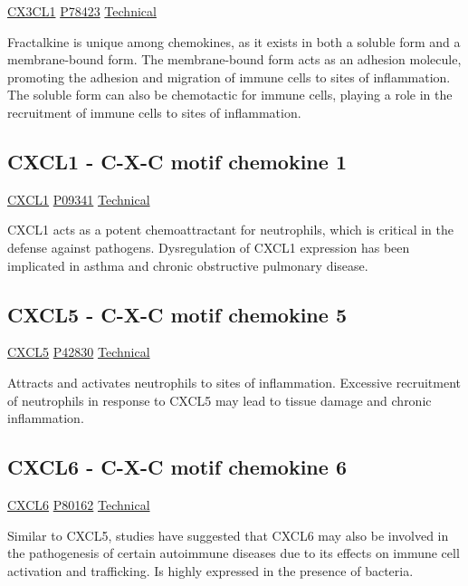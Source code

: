 \href{https://en.wikipedia.org/wiki/CX3CL1}{CX3CL1}
\href{http://www.uniprot.org/uniprot/P78423}{P78423}
\href{https://olink.com/products-services/target/protein/?assayID=5120}{Technical}

Fractalkine is unique among chemokines, as it exists in both a soluble form and a membrane-bound form. The membrane-bound form acts as an adhesion molecule, promoting the adhesion and migration of immune cells to sites of inflammation. The soluble form can also be chemotactic for immune cells, playing a role in the recruitment of immune cells to sites of inflammation.

\subsection{CXCL1 - C-X-C motif chemokine 1}

\href{https://en.wikipedia.org/wiki/CXCL1}{CXCL1}
\href{http://www.uniprot.org/uniprot/P09341}{P09341}
\href{https://olink.com/products-services/target/protein/?assayID=5074}{Technical}

CXCL1 acts as a potent chemoattractant for neutrophils, which is critical in the defense against pathogens. Dysregulation of CXCL1 expression has been implicated in asthma and chronic obstructive pulmonary disease.

\subsection{CXCL5 - C-X-C motif chemokine 5}

\href{https://en.wikipedia.org/wiki/CXCL5}{CXCL5}
\href{http://www.uniprot.org/uniprot/P42830}{P42830}
\href{https://olink.com/products-services/target/protein/?assayID=5059}{Technical}

Attracts and activates neutrophils to sites of inflammation. Excessive recruitment of neutrophils in response to CXCL5 may lead to tissue damage and chronic inflammation.

\subsection{CXCL6 - C-X-C motif chemokine 6}

\href{https://en.wikipedia.org/wiki/CXCL6}{CXCL6}
\href{http://www.uniprot.org/uniprot/P80162}{P80162}
\href{https://olink.com/products-services/target/protein/?assayID=5094}{Technical}

Similar to CXCL5, studies have suggested that CXCL6 may also be involved in the pathogenesis of certain autoimmune diseases due to its effects on immune cell activation and trafficking. Is highly expressed in the presence of bacteria.


